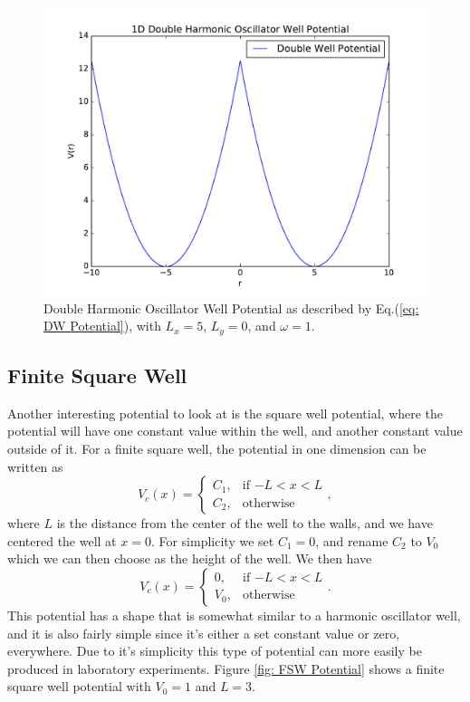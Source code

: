 \documentclass[../main.tex]{subfiles}
\begin{document}
\begin{figure}[!ht]
    \centering
    \includegraphics[scale=0.7]{figures/DW_Potential}
    \caption{Double Harmonic Oscillator Well Potential as described by Eq.(\ref{eq: DW Potential}), with $L_x = 5$, $L_y = 0$, and $\omega = 1$.}
    \label{fig: DW Potential}
\end{figure}

\subsection{Finite Square Well}

Another interesting potential to look at is the square well potential, where the potential will have one constant value within the well, and another constant value outside of it. For a finite square well, the potential in one dimension can be written as\cite{Griffiths}
\begin{equation}
    V_c(x) = \begin{cases}
  C_1, & \mbox{if $-L < x < L$} \\
  C_2, & \mbox{otherwise}
\end{cases},
\end{equation}
where $L$ is the distance from the center of the well to the walls, and we have centered the well at $x=0$. For simplicity we set $C_1 = 0$, and rename $C_2$ to $V_0$ which we can then choose as the height of the well. We then have
\begin{equation}\label{eq: FSW Potential}
    V_c(x) = \begin{cases}
  0, & \mbox{if $-L < x < L$} \\
  V_0, & \mbox{otherwise}
\end{cases}.
\end{equation}
This potential has a shape that is somewhat similar to a harmonic oscillator well, and it is also fairly simple since it's either a set constant value or zero, everywhere. Due to it's simplicity this type of potential can more easily be produced in laboratory experiments. Figure \ref{fig: FSW Potential} shows a finite square well potential with $V_0 = 1$ and $L = 3$.
\end{document}
